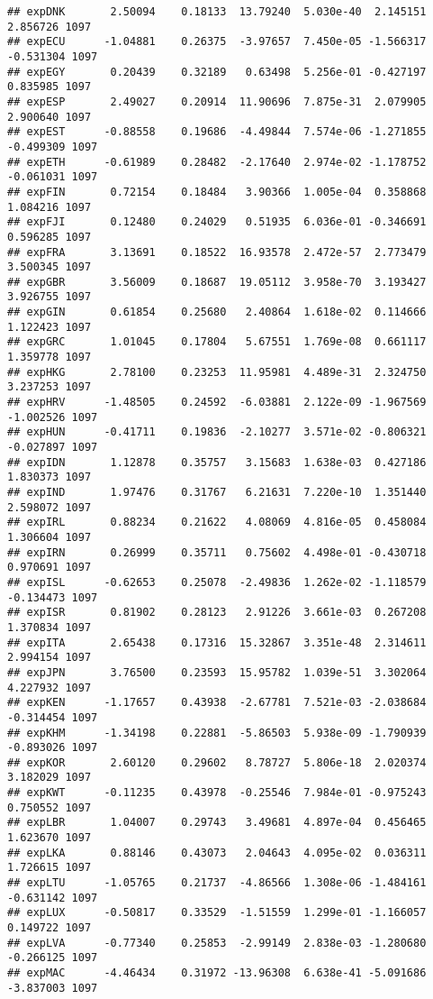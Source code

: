 \documentclass[
]{article}
\begin{document}
\begin{verbatim}
## expDNK       2.50094    0.18133  13.79240  5.030e-40  2.145151  2.856726 1097
## expECU      -1.04881    0.26375  -3.97657  7.450e-05 -1.566317 -0.531304 1097
## expEGY       0.20439    0.32189   0.63498  5.256e-01 -0.427197  0.835985 1097
## expESP       2.49027    0.20914  11.90696  7.875e-31  2.079905  2.900640 1097
## expEST      -0.88558    0.19686  -4.49844  7.574e-06 -1.271855 -0.499309 1097
## expETH      -0.61989    0.28482  -2.17640  2.974e-02 -1.178752 -0.061031 1097
## expFIN       0.72154    0.18484   3.90366  1.005e-04  0.358868  1.084216 1097
## expFJI       0.12480    0.24029   0.51935  6.036e-01 -0.346691  0.596285 1097
## expFRA       3.13691    0.18522  16.93578  2.472e-57  2.773479  3.500345 1097
## expGBR       3.56009    0.18687  19.05112  3.958e-70  3.193427  3.926755 1097
## expGIN       0.61854    0.25680   2.40864  1.618e-02  0.114666  1.122423 1097
## expGRC       1.01045    0.17804   5.67551  1.769e-08  0.661117  1.359778 1097
## expHKG       2.78100    0.23253  11.95981  4.489e-31  2.324750  3.237253 1097
## expHRV      -1.48505    0.24592  -6.03881  2.122e-09 -1.967569 -1.002526 1097
## expHUN      -0.41711    0.19836  -2.10277  3.571e-02 -0.806321 -0.027897 1097
## expIDN       1.12878    0.35757   3.15683  1.638e-03  0.427186  1.830373 1097
## expIND       1.97476    0.31767   6.21631  7.220e-10  1.351440  2.598072 1097
## expIRL       0.88234    0.21622   4.08069  4.816e-05  0.458084  1.306604 1097
## expIRN       0.26999    0.35711   0.75602  4.498e-01 -0.430718  0.970691 1097
## expISL      -0.62653    0.25078  -2.49836  1.262e-02 -1.118579 -0.134473 1097
## expISR       0.81902    0.28123   2.91226  3.661e-03  0.267208  1.370834 1097
## expITA       2.65438    0.17316  15.32867  3.351e-48  2.314611  2.994154 1097
## expJPN       3.76500    0.23593  15.95782  1.039e-51  3.302064  4.227932 1097
## expKEN      -1.17657    0.43938  -2.67781  7.521e-03 -2.038684 -0.314454 1097
## expKHM      -1.34198    0.22881  -5.86503  5.938e-09 -1.790939 -0.893026 1097
## expKOR       2.60120    0.29602   8.78727  5.806e-18  2.020374  3.182029 1097
## expKWT      -0.11235    0.43978  -0.25546  7.984e-01 -0.975243  0.750552 1097
## expLBR       1.04007    0.29743   3.49681  4.897e-04  0.456465  1.623670 1097
## expLKA       0.88146    0.43073   2.04643  4.095e-02  0.036311  1.726615 1097
## expLTU      -1.05765    0.21737  -4.86566  1.308e-06 -1.484161 -0.631142 1097
## expLUX      -0.50817    0.33529  -1.51559  1.299e-01 -1.166057  0.149722 1097
## expLVA      -0.77340    0.25853  -2.99149  2.838e-03 -1.280680 -0.266125 1097
## expMAC      -4.46434    0.31972 -13.96308  6.638e-41 -5.091686 -3.837003 1097

\end{verbatim}
\end{document}
